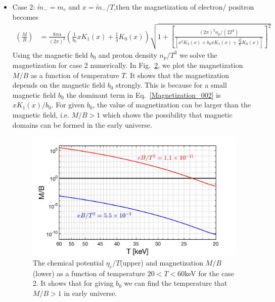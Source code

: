 \documentclass[Universe,article,submit,moreauthors,pdftex]{Definitions/mdpi}
\newcommand*{\req}[1]{Eq.~{\eqref{#1}}}
\newcommand*{\rf}[1]{Fig.~{\ref{#1}}}
\begin{document}
\begin{itemize}
\begin{figure}[t]
\label{Case1_fig} 
\end{figure}
\\
  \item Case 2: $\tilde m_-=m_e$ and $x=\tilde m_-/T$,then the magnetization of electron/ positron becomes
\begin{align}\label{Magnetization_002}
\left(\frac{M}{B}\right)&=\frac{8\pi\alpha}{(2\pi)^2}\left(\frac{1}{b_0}xK_1(x)+\frac{1}{3}K_0(x)\right)\sqrt{1+\left[\frac{{(2\pi)^2n_p}/{(2T^3)}}{\left[x^2K_2(x)+b_0x K_1(x)+\frac{b^2_0}{6}K_0(x)\right]}\right]^2}
\end{align}
Using the magnetic field $b_0$ and proton density $n_p/T^3$ we solve the magnetization  for case 2 numerically. In \rf{Case2_fig}, we plot the  magnetization $M/B$ as a function of temperature $T$. It shows that the magnetization depends on the magnetic field $b_0$ strongly. This is because for a small magnetic field $b_0$ the dominant term in \req{Magnetization_002} is $xK_1(x)/b_0$. For given $b_0$, the value of magnetization can be larger than the magnetic field, i.e. $M/B>1$  which shows the possibility that magnetic domains can be formed in the early universe.

\begin{figure}[h]
\centering
\includegraphics[width=0.75\linewidth]{./plots/Magnetization_case2.jpg}
\caption{The chemical potential $\eta_{e}/T$(upper) and magnetization $M/B$(lower) as a function of temperature $20<T<60$keV  for the case 2.  It shows that for giving $b_0$ we can find the temperature that $M/B>1$ in early universe.}
\label{Case2_fig} 
\end{figure}

\end{itemize}
\end{document}
